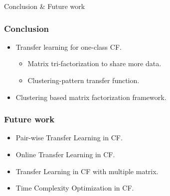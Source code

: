 \documentclass[xetex,mathserif,serif]{beamer}
\begin{document}
\begin{section}{Conclusion \& Future work}
  \begin{frame}
    \frametitle{Conclusion}
    \begin{itemize}
    \item Transfer learning for one-class CF.
      \begin{itemize}
      \item Matrix tri-factorization to share more data.
      \item Clustering-pattern transfer function.
      \end{itemize}
    \item Clustering based matrix factorization framework.
    \end{itemize}
  \end{frame}
  \begin{frame}
    \frametitle{Future work}
    \begin{itemize}
\item  Pair-wise Transfer Learning in CF.
\item  Online Transfer Learning in CF.
\item Transfer Learning in CF with multiple matrix.
\item Time Complexity Optimization in CF.
\end{itemize}
\end{frame}
\end{section}
\end{document}
